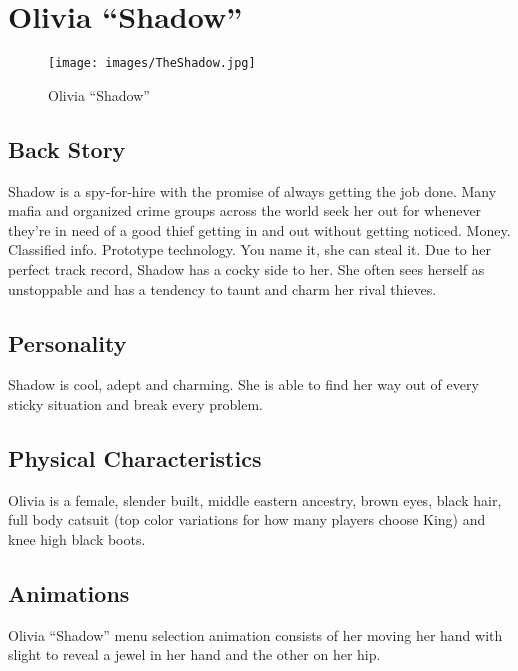 \documentclass[10pt]{report}
\begin{document}
\pagebreak

\section{Olivia ``Shadow''}

\begin{multicols}{2}
    \begin{figure}[H]
        \centering
        \texttt{[image: images/TheShadow.jpg]}
        \caption{Olivia ``Shadow''}
    \end{figure}
    
    \subsection{Back Story}
    
    Shadow is a spy-for-hire with the promise of always getting the job done. Many mafia and organized crime groups across the world seek her out for whenever they’re in need of a good thief getting in and out without getting noticed. Money. Classified info. Prototype technology. You name it, she can steal it. Due to her perfect track record, Shadow has a cocky side to her. She often sees herself as unstoppable and has a tendency to taunt and charm her rival thieves.
    
    \subsection{Personality}
    
    Shadow is cool, adept and charming. She is able to find her way out of every sticky situation and break every problem.
    
    \subsection{Physical Characteristics}
    
    Olivia is a female, slender built, middle eastern ancestry, brown eyes, black hair, full body catsuit (top color variations for how many players choose King) and knee high black boots.
    
    \subsection{Animations}
    
    Olivia “Shadow” menu selection animation consists of her moving her hand with slight to reveal a jewel in her hand and the other on her hip.
    

\end{multicols}
\end{document}
